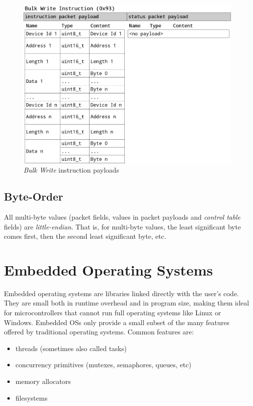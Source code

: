 \begin{figure}[H]
    \centering
    \includegraphics[scale=0.2]{img/bulk_write_packet.png}
    \caption{\textit{Bulk Write} instruction payloads}
\end{figure}

\subsection{Byte-Order}
\label{basics/dynamixel-protocol/byte-order}

All multi-byte values (packet fields, values in packet payloads and \textit{control table} fields) are
\textit{little-endian}. That is, for multi-byte values, the least significant byte comes first, then the
second least significant byte, etc.

\section{Embedded Operating Systems}
\label{basics/embedded-operating-systems}

Embedded operating systems are libraries linked directly with the user's code. They are small
both in runtime overhead and in program size, making them ideal for microcontrollers that cannot run
full operating systems like Linux or Windows. Embedded OSs only provide a small subset of the many
features offered by traditional operating systems. Common features are:

\begin{itemize}
    \item threads (sometimes also called tasks)
    \item concurrency primitives (mutexes, semaphores, queues, etc)
    \item memory allocators
    \item filesystems
\end{itemize}

